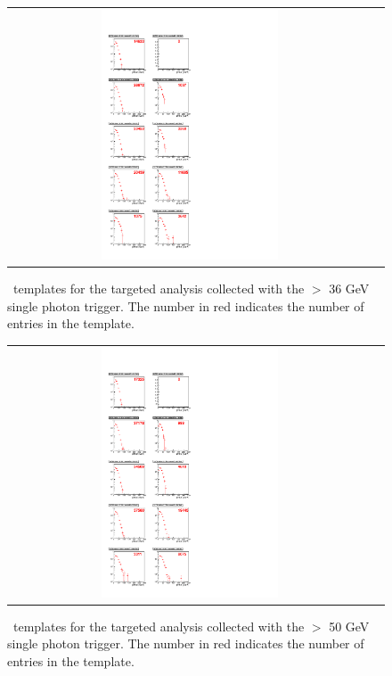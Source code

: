 \clearpage

\begin{figure}[!h]
\begin{center}
\begin{tabular}{cc}
\includegraphics[width=0.5\textwidth]{plots/template_targeted_1.pdf}
\end{tabular}
\caption{
\MET\ templates for the targeted analysis collected with the \pt $>$ 36 GeV single photon trigger.
The number in red indicates the number of entries in the template.
}
\end{center}
\end{figure}

\clearpage

\begin{figure}[!h]
\begin{center}
\begin{tabular}{cc}
\includegraphics[width=0.5\textwidth]{plots/template_targeted_2.pdf}
\end{tabular}
\caption{
\MET\ templates for the targeted analysis collected with the  \pt $>$ 50 GeV single photon trigger.
The number in red indicates the number of entries in the template.
}
\end{center}
\end{figure}


